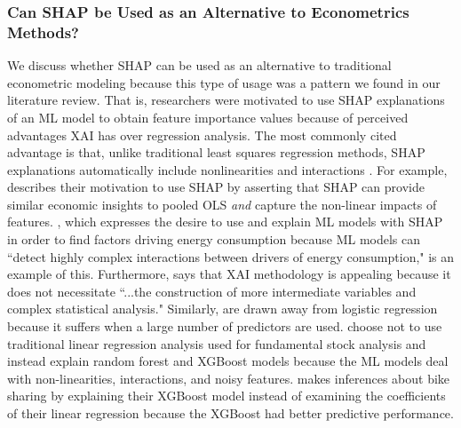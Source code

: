 \documentclass[12pt]{article}  %
\begin{document}
\subsubsection{Can SHAP be Used as an Alternative to Econometrics Methods?}
    We discuss whether SHAP can be used as an alternative to traditional econometric modeling because this type of usage was a pattern we found in our literature review. That is, researchers were motivated to use SHAP explanations of an ML model to obtain feature importance values because of perceived advantages XAI has over regression analysis. The most commonly cited advantage is that, unlike traditional least squares regression methods, SHAP explanations automatically include nonlinearities and interactions \cite{hanauer22boosting,berger2023supply,srivastava23energy,banulescu2023practical,li24roles}. For example, \cite{berger2023supply} describes their motivation to use SHAP by asserting that SHAP can provide similar economic insights to pooled OLS \emph{and} capture the non-linear impacts of features. \cite{srivastava23energy}, which expresses the desire to use and explain ML models with SHAP in order to find factors driving energy consumption because ML models can ``detect highly complex interactions between drivers of energy consumption," is an example of this. Furthermore, \cite{zhou23consumption} says that XAI methodology is appealing because it does not necessitate ``...the construction of more intermediate variables and complex statistical analysis." Similarly, \cite{banulescu2023practical} are drawn away from logistic regression because it suffers when a large number of predictors are used. \cite{hanauer22boosting} choose not to use traditional linear regression analysis used for fundamental stock analysis and instead explain random forest and XGBoost models because the ML models deal with non-linearities, interactions, and noisy features. \cite{li24roles} makes inferences about bike sharing by explaining their XGBoost model instead of examining the coefficients of their linear regression because the XGBoost had better predictive performance. 
\end{document}
